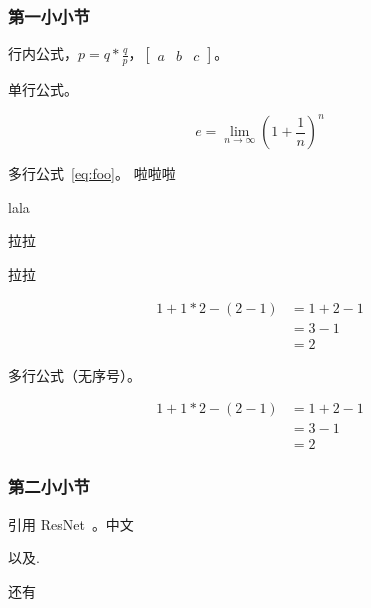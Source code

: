 \subsubsection{第一小小节}

行内公式，$p = q * \frac{q}{p}$，$\begin{bmatrix} a & b & c \end{bmatrix}$。

单行公式。

\begin{equation}
    e = \lim_{n\to \infty} \left(1 + \frac{1}{n}\right)^n
\end{equation}

多行公式~\ref{eq:foo}。
啦啦啦

lala

拉拉

拉拉

\begin{equation}
    \begin{aligned}
        1+ 1*2 - (2-1) & = 1+ 2 - 1 \\
                       & = 3-1      \\
                       & = 2
    \end{aligned}
    \label{eq:foo}
\end{equation}

多行公式（无序号）。

\begin{equation*}
    \begin{aligned}
        1+ 1*2 - (2-1) & = 1+ 2 - 1 \\
                       & = 3-1      \\
                       & = 2
    \end{aligned}
\end{equation*}

\subsubsection{第二小小节}

引用 ResNet~\cite{leiJiYuShenDuXueXiLiLunDeJiJieZhuangBeiDaShuJuJianKangJianCeFangFa2015,quJiJieGuZhangDeQuanXiZhenDuanYuanLi2007,zhangyongJiYuXiangSiLiShiXinXiQianYiXueXiDeJinHuaYouHuaKuangJia2021}。中文\cite{liangCompoundFaultDiagnosis2019,houShiXuShuJuWaJueJiQiZaiGuZhangZhenDuanZhongDeYingYongYanJiu2006}

以及\cite{weiConvolutionalNeuralNetworks2019,saitoMaximumClassifierDiscrepancy2018}.

还有\cite{shiMultisourceDomainFactorization2022}
